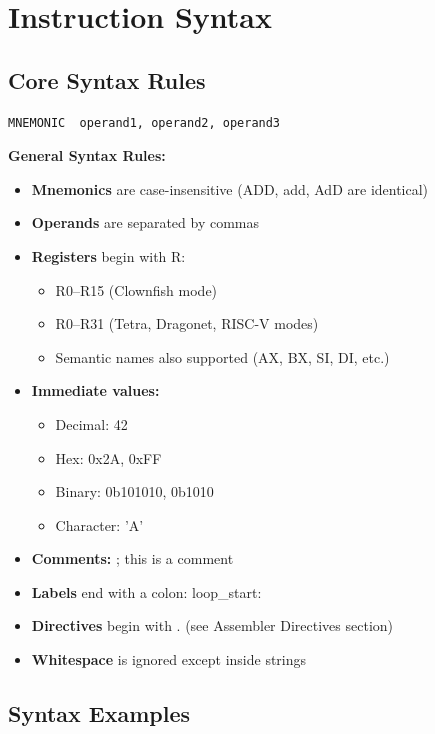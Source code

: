 \documentclass[12pt]{article}
\begin{document}
\section{Instruction Syntax}

\subsection{Core Syntax Rules}

\begin{lstlisting}[language={[x86masm]Assembler}]
MNEMONIC  operand1, operand2, operand3
\end{lstlisting}

\textbf{General Syntax Rules:}

\begin{itemize}
    \item \textbf{Mnemonics} are case-insensitive (ADD, add, AdD are identical)
    \item \textbf{Operands} are separated by commas
    \item \textbf{Registers} begin with R:
    \begin{itemize}
        \item R0--R15 (Clownfish mode)
        \item R0--R31 (Tetra, Dragonet, RISC-V modes)
        \item Semantic names also supported (AX, BX, SI, DI, etc.)
    \end{itemize}
    \item \textbf{Immediate values:}
    \begin{itemize}
        \item Decimal: 42
        \item Hex: 0x2A, 0xFF
        \item Binary: 0b101010, 0b1010
        \item Character: 'A'
    \end{itemize}
    \item \textbf{Comments:} ; this is a comment
    \item \textbf{Labels} end with a colon: loop\_start:
    \item \textbf{Directives} begin with . (see Assembler Directives section)
    \item \textbf{Whitespace} is ignored except inside strings
\end{itemize}

\subsection{Syntax Examples}
\end{document}
